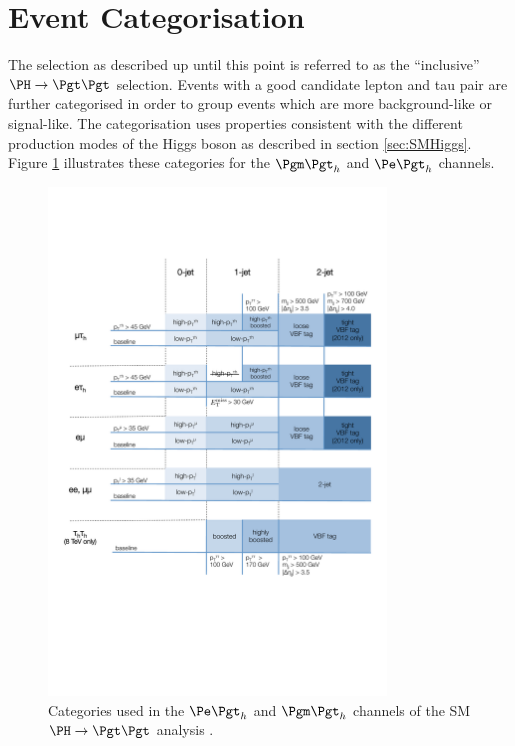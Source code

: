 \section{Event Categorisation}
\label{sec:eventcategorisation}

The selection as described up until this point is referred to as the
``inclusive'' $\HToTauTau$ selection. 
Events with a good candidate lepton and tau pair are further categorised in
order to group events which are more background-like or signal-like. The
categorisation uses properties consistent with the different production modes of
the Higgs boson as described in section \ref{sec:SMHiggs}. Figure
\ref{fig:smcategories} illustrates these categories for the $\mutau$ and $\etau$
channels.

\begin{figure}[htb]
\begin{center}
    \includegraphics[width=0.8\textwidth]
      {plots/htt-sm/categories_2012.pdf}
\end{center}
\caption{
 Categories used in the $\etau$ and $\mutau$ channels of the \ac{SM}
 $\HToTauTau$ analysis \cite{HIG-13-004}.  
}
\label{fig:smcategories}
\end{figure}

